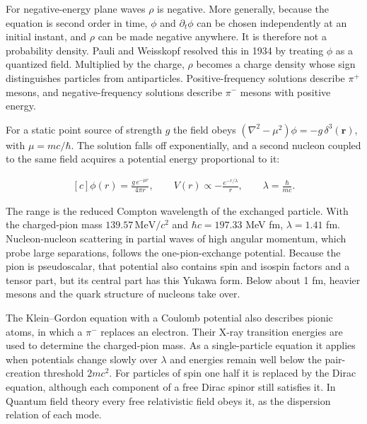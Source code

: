 \documentclass[11pt,oneside]{book}
\newenvironment{centeredalign}{\[\begin{gathered}[c]}{\end{gathered}\]}
\begin{document}
For negative-energy plane waves \(\rho\) is negative. More generally, because the equation is second order in time, \(\phi\) and \(\partial_t\phi\) can be chosen independently at an initial instant, and \(\rho\) can be made negative anywhere. It is therefore not a probability density. Pauli and Weisskopf resolved this in 1934 by treating \(\phi\) as a quantized field. Multiplied by the charge, \(\rho\) becomes a charge density whose sign distinguishes particles from antiparticles. Positive-frequency solutions describe \(\pi^+\) mesons, and negative-frequency solutions describe \(\pi^-\) mesons with positive energy.

For a static point source of strength \(g\) the field obeys \((\nabla^2-\mu^2)\phi=-g\,\delta^3(\mathbf r)\), with \(\mu=mc/\hbar\). The solution falls off exponentially, and a second nucleon coupled to the same field acquires a potential energy proportional to it:

\begin{centeredalign}
\phi(r)=\frac{g\,e^{-\mu r}}{4\pi r},\qquad
V(r)\propto-\frac{e^{-r/\lambda}}{r},\qquad \lambda=\frac{\hbar}{mc}.
\end{centeredalign}

The range is the reduced Compton wavelength of the exchanged particle. With the charged-pion mass \(139.57\,\mathrm{MeV}/c^2\) and \(\hbar c=197.33\) MeV fm, \(\lambda=1.41\) fm. Nucleon-nucleon scattering in partial waves of high angular momentum, which probe large separations, follows the one-pion-exchange potential. Because the pion is pseudoscalar, that potential also contains spin and isospin factors and a tensor part, but its central part has this Yukawa form. Below about 1 fm, heavier mesons and the quark structure of nucleons take over.

The Klein--Gordon equation with a Coulomb potential also describes pionic atoms, in which a \(\pi^-\) replaces an electron. Their X-ray transition energies are used to determine the charged-pion mass. As a single-particle equation it applies when potentials change slowly over \(\lambda\) and energies remain well below the pair-creation threshold \(2mc^2\). For particles of spin one half it is replaced by the Dirac equation, although each component of a free Dirac spinor still satisfies it. In Quantum field theory every free relativistic field obeys it, as the dispersion relation of each mode.
\end{document}
